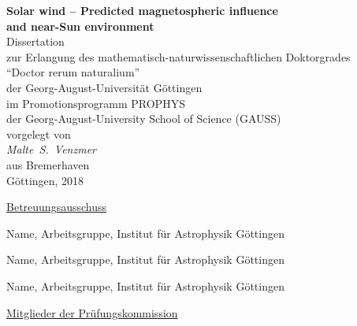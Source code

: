 
\begin{titlepage}
	\begin{center}
		\vspace*{\fill}
		\renewcommand{\baselinestretch}{1.5}
		{\LARGE\sffamily
			\textbf{Solar wind -- Predicted magnetospheric influence\\and near-Sun environment}\\
		}
		\Large\rmfamily
		\vspace{3\baselineskip}
		Dissertation\\
		zur Erlangung des mathematisch-naturwissenschaftlichen Doktorgrades\\
		``Doctor rerum naturalium''\\
		der Georg-August-Universität Göttingen\\
		\vspace{\baselineskip}
		im Promotionsprogramm PROPHYS\\
		der Georg-August-University School of Science (GAUSS)\\
		\vspace{4\baselineskip}
		vorgelegt von\\
		\textit{%
			Malte~S.~Venzmer\\
		}
		aus Bremerhaven\\
		\vspace{4\baselineskip}
		Göttingen, 2018
		\vspace{\baselineskip}
		\vspace{\fill}
	\end{center}
\end{titlepage}

\newpage


\vspace*{\fill}

\noindent \underline{Betreuungsausschuss}
\vspace{\baselineskip}

Name, Arbeitsgruppe, Institut für Astrophysik Göttingen
\vspace{\baselineskip}

Name, Arbeitsgruppe, Institut für Astrophysik Göttingen
\vspace{\baselineskip}

Name, Arbeitsgruppe, Institut für Astrophysik Göttingen
\vspace{3\baselineskip}

\noindent \underline{Mitglieder der Prüfungskommission}
\vspace{\baselineskip}


